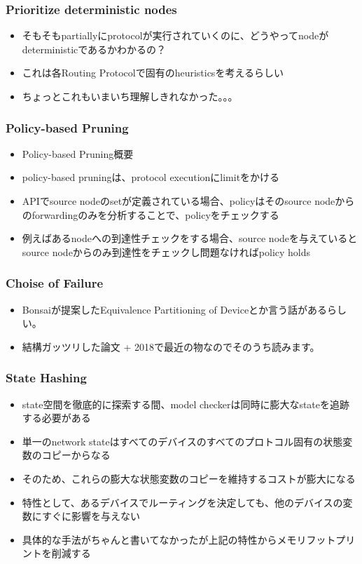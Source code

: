 \documentclass[dvipdfmx,9pt,notheorems]{beamer}
\theoremstyle{definition}
\begin{document}
\begin{frame}\frametitle{Prioritize deterministic nodes}
\begin{itemize}
	\item そもそもpartiallyにprotocolが実行されていくのに、どうやってnodeがdeterministicであるかわかるの？
	\item これは各Routing Protocolで固有のheuristicsを考えるらしい
	\item ちょっとこれもいまいち理解しきれなかった。。。
\end{itemize}
\pnote{
}
\end{frame}

\begin{frame}\frametitle{Policy-based Pruning}
\begin{itemize}
	\item Policy-based Pruning概要
	\item policy-based pruningは、protocol executionにlimitをかける
	\item APIでsource nodeのsetが定義されている場合、policyはそのsource nodeからのforwardingのみを分析することで、policyをチェックする
	\item 例えばあるnodeへの到達性チェックをする場合、source nodeを与えているとsource nodeからのみ到達性をチェックし問題なければpolicy holds
\end{itemize}
\pnote{
}
\end{frame}

\begin{frame}\frametitle{Choise of Failure}
\begin{itemize}
	\item Bonsaiが提案したEquivalence Partitioning of Deviceとか言う話があるらしい。
	\item 結構ガッツリした論文 + 2018で最近の物なのでそのうち読みます。
\end{itemize}
\pnote{
}
\end{frame}

\begin{frame}\frametitle{State Hashing}
\begin{itemize}
	\item state空間を徹底的に探索する間、model checkerは同時に膨大なstateを追跡する必要がある
	\item 単一のnetwork stateはすべてのデバイスのすべてのプロトコル固有の状態変数のコピーからなる
	\item そのため、これらの膨大な状態変数のコピーを維持するコストが膨大になる
	\item 特性として、あるデバイスでルーティングを決定しても、他のデバイスの変数にすぐに影響を与えない
	\item 具体的な手法がちゃんと書いてなかったが上記の特性からメモリフットプリントを削減する
\end{itemize}
\pnote{
}
\end{frame}
\end{document}
